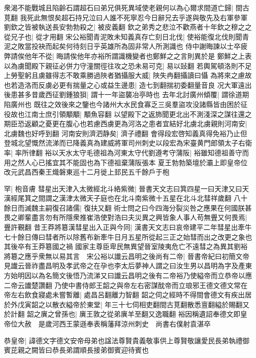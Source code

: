 衆渴不能戰城且陷齡石謂超石曰弟兄俱死異域使老親何以為心爾求間道亡歸|{
	間古莧翻}
我死此無恨矣超石持兄泣曰人誰不死寧忍今日辭兄去乎遂與敬先及右軍參軍劉欽之皆被執送長安勃勃殺之|{
	被皮義翻}
欽之弟秀之悲泣不歡燕者十年欽之穆之之從兄子也|{
	從才用翻}
宋公裕聞青泥敗未知義真存亡刻日北伐|{
	使裕能復北伐則聞青泥之敗當投袂而起矣何待刻日乎英雄所為固非常人所測識也}
侍中謝晦諫以士卒疲弊請俟他年不從|{
	晦請俟他年亦裕所謂識機變者也鄭鮮之之言則異於是}
鄭鮮之上表以為虜聞殿下親征必併力守潼關徑往攻之恐未易可克|{
	易以䜴翻}
若輿駕頓洛則不足上勞聖躬且虜雖得志不敢乘勝過陜者猶攝服大威|{
	陜失冉翻攝讀曰懾}
為將來之慮故也若造洛而反虜必更有揣量之心或益生邊患|{
	造七到翻揣初委翻量音良}
况大軍遠出後患甚多昔歲西征劉鍾狼狽|{
	謂十一年盜襲冶亭時也}
去年北討廣州傾覆|{
	謂徐道期陷廣州也}
既往之效後來之鑒也今諸州大水民食寡乏三吳羣盜攻没諸縣皆由困於征役故也江南士庶引領顒顒|{
	顒魚容翻}
以望殿下之返斾聞更北出不測淺深之謀往還之期臣恐返顧之憂更在腹心也若慮西虜更為河洛之患者宜結好北虜北虜親則河南安|{
	北虜魏也好呼到翻}
河南安則濟泗静矣|{
	濟子禮翻}
會得段宏啓知義真得免裕乃止但登城北望慨然流涕而已降義真為建威將軍司州刺史以段宏為宋臺黄門郎領太子右衛率|{
	率所律翻}
裕以天水太守毛德祖為河東太守代劉遵考守蒲阪|{
	裕雖知德祖善守而用之然人心已搖宜其不能固也為下德祖棄蒲阪張本}
夏王勃勃築壇於灞上即皇帝位改元武昌西秦王熾磐東巡十二月徙上邽民五千餘戶于枹

罕|{
	枹音膚}
彗星出天津入太微經北斗絡紫微|{
	晉書天文志曰箕四星一曰天津又曰天漢經尾箕之間謂之漢津太微天子庭也在北斗南紫微十五星在北斗北彗祥歲翻}
八十餘日而滅魏主嗣復召諸儒|{
	復扶又翻}
術士問之曰今四海分裂災咎之應果在何國朕甚畏之卿輩盡言勿有所隱衆推崔浩使對浩曰夫災異之興皆象人事人苟無舋又何畏焉|{
	舋許覲翻}
昔王莽將簒漢彗星出入正與今同|{
	漢書天文志曰哀帝建平二年彗星出牽牛七十餘日傳曰彗者所以除舊布新牽牛日月五星所從起三正之始彗而出之改更之象也其後卒有王莽簒國之禍}
國家主尊臣卑民無異望晉室陵夷危亡不遠彗之為異其劉裕將簒之應乎衆無以易其言　宋公裕以䜟云昌明之後尚有二帝|{
	晉書帝紀曰初簡文帝見䜟云晉祚盡昌明及孝武帝之在孕也李太后夢神人謂之曰汝生男以昌明為字及產東方始明因以為名簡文後悟乃流涕又曰䜟云昌明之後有二帝裕乃使縊帝而立恭帝以應二帝云䜟楚讚翻}
乃使中書侍郎王韶之與帝左右密謀酖帝而立琅邪王德文德文常在帝左右飲食寢處未嘗暫離|{
	處昌呂翻離力智翻}
韶之伺之經時不得間會德文有疾出居於外戊寅韶之以散衣縊帝於東堂|{
	年三十七伺相吏翻間古莧翻散悉亶翻縊於賜翻又於計翻}
韶之廙之曾孫也|{
	廙王敦之從弟廙羊至翻又逸職翻}
裕因稱遺詔奉德文即皇帝位大赦　是歲河西王蒙遜奉表稱藩拜涼州刺史　尚書右僕射袁湛卒

恭皇帝|{
	諱德文字德文安帝母弟也諡法尊賢貴義敬事供上尊賢敬讓愛民長弟執禮御賓芘親之闕皆曰恭長弟謂順長接弟御賓迎待賓也}


